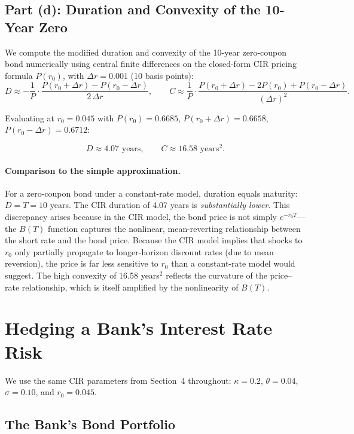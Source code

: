 \documentclass[12pt, a4paper]{article}
\begin{document}
\subsection{Part (d): Duration and Convexity of the 10-Year Zero}

We compute the modified duration and convexity of the 10-year zero-coupon bond numerically using central finite differences on the closed-form CIR pricing formula $P(r_0)$, with $\Delta r = 0.001$ (10 basis points):
\[
D \approx -\frac{1}{P}\cdot\frac{P(r_0+\Delta r) - P(r_0-\Delta r)}{2\,\Delta r}, \qquad
C \approx \frac{1}{P}\cdot\frac{P(r_0+\Delta r) - 2P(r_0) + P(r_0-\Delta r)}{(\Delta r)^2}.
\]

Evaluating at $r_0 = 0.045$ with $P(r_0) = 0.6685$, $P(r_0+\Delta r) = 0.6658$, $P(r_0-\Delta r) = 0.6712$:

\[
\boxed{D \approx 4.07 \text{ years}, \qquad C \approx 16.58 \text{ years}^2.}
\]

\paragraph{Comparison to the simple approximation.}
For a zero-coupon bond under a constant-rate model, duration equals maturity: $D = T = 10$ years. The CIR duration of 4.07 years is \emph{substantially lower}. This discrepancy arises because in the CIR model, the bond price is not simply $e^{-r_0 T}$---the $B(T)$ function captures the nonlinear, mean-reverting relationship between the short rate and the bond price. Because the CIR model implies that shocks to $r_0$ only partially propagate to longer-horizon discount rates (due to mean reversion), the price is far less sensitive to $r_0$ than a constant-rate model would suggest. The high convexity of 16.58 years$^2$ reflects the curvature of the price--rate relationship, which is itself amplified by the nonlinearity of $B(T)$.

\section{Hedging a Bank's Interest Rate Risk}

We use the same CIR parameters from Section~4 throughout: $\kappa = 0.2$, $\theta = 0.04$, $\sigma = 0.10$, and $r_0 = 0.045$.

\subsection{The Bank's Bond Portfolio}
\label{sec:portfolio}
\end{document}
